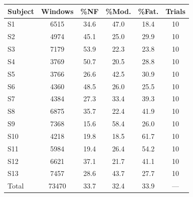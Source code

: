 \begin{tabular}{lccccc}
\toprule
Subject & Windows & \%NF & \%Mod. & \%Fat. & Trials \\
\midrule
S1 & 6515 & 34.6 & 47.0 & 18.4 & 10 \\
S2 & 4974 & 45.1 & 25.0 & 29.9 & 10 \\
S3 & 7179 & 53.9 & 22.3 & 23.8 & 10 \\
S4 & 3769 & 50.7 & 20.5 & 28.8 & 10 \\
S5 & 3766 & 26.6 & 42.5 & 30.9 & 10 \\
S6 & 4360 & 48.5 & 26.0 & 25.5 & 10 \\
S7 & 4384 & 27.3 & 33.4 & 39.3 & 10 \\
S8 & 6875 & 35.7 & 22.4 & 41.9 & 10 \\
S9 & 7368 & 15.6 & 58.4 & 26.0 & 10 \\
S10 & 4218 & 19.8 & 18.5 & 61.7 & 10 \\
S11 & 5984 & 19.4 & 26.4 & 54.2 & 10 \\
S12 & 6621 & 37.1 & 21.7 & 41.1 & 10 \\
S13 & 7457 & 28.6 & 43.7 & 27.7 & 10 \\
\midrule
Total & 73470 & 33.7 & 32.4 & 33.9 & --- \\
\bottomrule
\end{tabular}